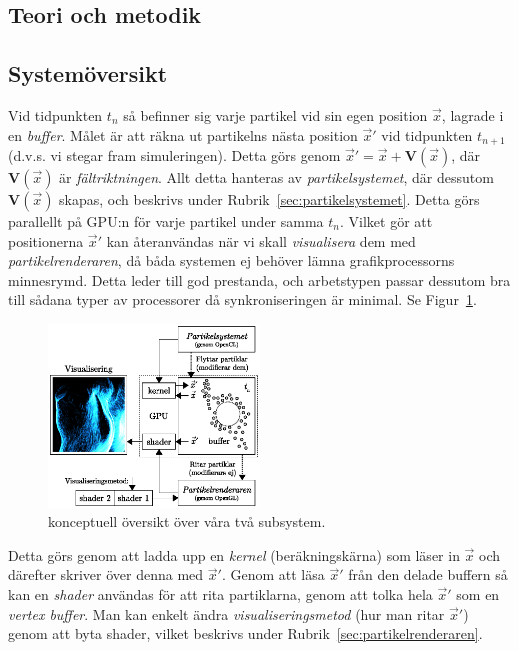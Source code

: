 \documentclass[a4paper]{article}
\begin{document}
\begin{multicols}{2}
    \vspace{-0.5cm}
    \section{Teori och metodik}
    \vspace{-0.3cm}
    \subsection{Systemöversikt} \label{sec:system}

    Vid tidpunkten \(t_n\) så befinner sig varje partikel vid sin egen position \(\vec{x}\), lagrade i en \emph{buffer}. Målet är att räkna ut partikelns nästa position \(\vec{x}'\) vid tidpunkten \(t_{n+1}\) (d.v.s. vi stegar fram simuleringen). Detta görs genom \(\vec{x}' = \vec{x} + \mathbf{V}(\vec{x})\), där \(\mathbf{V}(\vec{x})\) är \emph{fältriktningen}. Allt detta hanteras av \emph{partikelsystemet}, där dessutom \(\mathbf{V}(\vec{x})\) skapas, och beskrivs under Rubrik~\ref{sec:partikelsystemet}. Detta görs parallellt på GPU:n för varje partikel under samma \(t_n\). Vilket gör att positionerna \(\vec{x}'\) kan återanvändas när vi skall \emph{visualisera} dem med \emph{partikelrenderaren}, då båda systemen ej behöver lämna grafikprocessorns minnesrymd. Detta leder till god prestanda, och arbetstypen passar dessutom bra till sådana typer av processorer då synkroniseringen är minimal. Se Figur~\ref{fig:system}.

    \begin{figure}[H]
    \center
    \includegraphics[width=0.5\textwidth]{share/System.eps}
    \caption{konceptuell översikt över våra två subsystem.}
    \label{fig:system}
    \end{figure}

    Detta görs genom att ladda upp en \emph{kernel} (beräkningskärna) som läser in \(\vec{x}\) och därefter skriver över denna med \(\vec{x}'\). Genom att läsa \(\vec{x}'\) från den delade buffern så kan en \emph{shader} användas för att rita partiklarna, genom att tolka hela \(\vec{x}'\) som en \emph{vertex buffer}. Man kan enkelt ändra \emph{visualiseringsmetod} (hur man ritar \(\vec{x}'\)) genom att byta shader, vilket beskrivs under Rubrik~\ref{sec:partikelrenderaren}.


\end{multicols}
\end{document}
